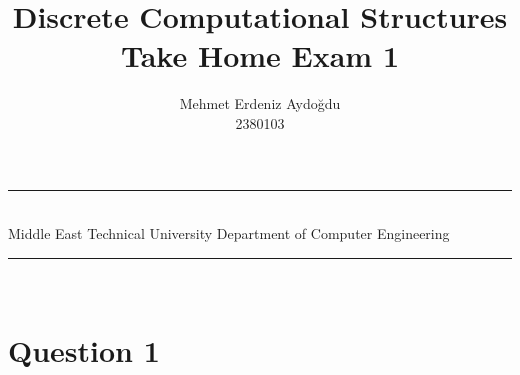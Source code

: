 \documentclass[a4paper,12pt]{article}
\title{Discrete Computational Structures \\ Take Home Exam 1}
\author{Mehmet Erdeniz Aydoğdu \\ 2380103} %
\date{} %
\newcommand{\HRule}{\rule{\linewidth}{1mm}}
\begin{document}
\HRule\\
Middle East Technical University \hfill Department of Computer Engineering
{\let\newpage\relax\maketitle}
\HRule\\
\vspace{1cm}


\section*{Question 1 \hfill {}}
\end{document}
